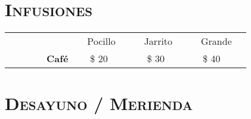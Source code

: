 \section{\textsc{\textbf{Infusiones}}}

\begin{table}
 \begin{tabular}{l c c c } 
 ~ & $ \> \> \> $ Pocillo $\> \> \> $ & $\> \> \> $ Jarrito $\> \> \> $ & $\> \> \> $ Grande $\> \> \> $ \\ %
 $\> \> \> \>  \> \> \> \> \> \> \> \> \> \> \> \>  $ \textbf{Café} & $\> \> \> $ \$ 20    & $\> \> \> $ \$ 30    & \$ 40   \\
 \end{tabular}
\end{table}

\section{\textsc{\textbf{Desayuno / Merienda}}}


